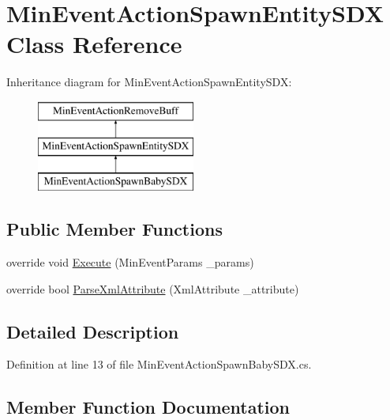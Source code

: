 \hypertarget{class_min_event_action_spawn_entity_s_d_x}{}\section{Min\+Event\+Action\+Spawn\+Entity\+S\+DX Class Reference}
\label{class_min_event_action_spawn_entity_s_d_x}
Inheritance diagram for Min\+Event\+Action\+Spawn\+Entity\+S\+DX\+:\begin{figure}[H]
\begin{center}
\leavevmode
\includegraphics[height=3.000000cm]{de/d8f/class_min_event_action_spawn_entity_s_d_x}
\end{center}
\end{figure}
\subsection*{Public Member Functions}
\begin{DoxyCompactItemize}
\item 
override void \mbox{\hyperlink{class_min_event_action_spawn_entity_s_d_x_ab1fd41d8728344b825783fc8470e439d}{Execute}} (Min\+Event\+Params \+\_\+params)
\item 
override bool \mbox{\hyperlink{class_min_event_action_spawn_entity_s_d_x_a389a7121b78b6fa55999a29d77b7886e}{Parse\+Xml\+Attribute}} (Xml\+Attribute \+\_\+attribute)
\end{DoxyCompactItemize}


\subsection{Detailed Description}


Definition at line 13 of file Min\+Event\+Action\+Spawn\+Baby\+S\+D\+X.\+cs.



\subsection{Member Function Documentation}
\mbox{\label{class_min_event_action_spawn_entity_s_d_x_ab1fd41d8728344b825783fc8470e439d}} 
